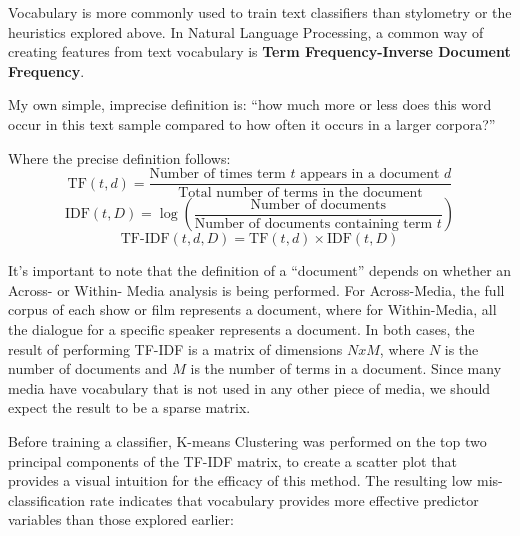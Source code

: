 \documentclass{article}
\begin{document}
\begin{titlepage}
Vocabulary is more commonly used to train text classifiers than stylometry or the heuristics explored above. In Natural Language Processing, a common way of creating features from text vocabulary is \textbf{Term Frequency-Inverse Document Frequency}.

My own simple, imprecise definition is: ``how much more or less does this word occur in this text sample compared to how often it occurs in a larger corpora?''

Where the precise definition follows:
\[
\text{TF}(t, d) = \frac{\text{Number of times term } t \text{ appears in a document } d}{\text{Total number of terms in the document}}
\]
\[
\text{IDF}(t, D) = \log \left( \frac{\text{Number of documents}}{\text{Number of documents containing term } t} \right)
\]
\[
\text{TF-IDF}(t, d, D) = \text{TF}(t, d) \times \text{IDF}(t, D)
\]

It's important to note that the definition of a ``document'' depends on whether an Across- or Within- Media analysis is being performed. For Across-Media, the full corpus of each show or film represents a document, where for Within-Media, all the dialogue for a specific speaker represents a document. In both cases, the result of performing TF-IDF is a matrix of dimensions $NxM$, where $N$ is the number of documents and $M$ is the number of terms in a document. Since many media have vocabulary that is not used in any other piece of media, we should expect the result to be a sparse matrix.

Before training a classifier, K-means Clustering was performed on the top two principal components of the TF-IDF matrix, to create a scatter plot that provides a visual intuition for the efficacy of this method. The resulting low mis-classification rate indicates that vocabulary provides more effective predictor variables than those explored earlier:


\end{titlepage}
\end{document}
